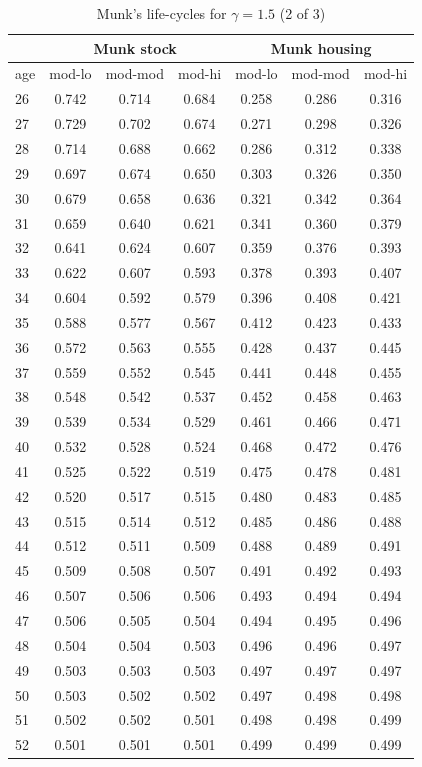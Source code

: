 \documentclass[]{elsarticle}
\begin{document}
\begin{appendix}
\begin{table}[H]
	\centering
	\caption[]{Munk's life-cycles for $\gamma = 1.5$ (2 of 3)}
	\begin{tabular}[c]{lcccccc}
&\multicolumn{3}{c}{Munk stock}&\multicolumn{3}{c}{Munk housing}\\
		\hline
age&mod-lo&mod-mod&mod-hi&mod-lo&mod-mod&mod-hi\\
		\hline
26&0.742&0.714&0.684&0.258&0.286&0.316\\
27&0.729&0.702&0.674&0.271&0.298&0.326\\
28&0.714&0.688&0.662&0.286&0.312&0.338\\
29&0.697&0.674&0.650&0.303&0.326&0.350\\
30&0.679&0.658&0.636&0.321&0.342&0.364\\
31&0.659&0.640&0.621&0.341&0.360&0.379\\
32&0.641&0.624&0.607&0.359&0.376&0.393\\
33&0.622&0.607&0.593&0.378&0.393&0.407\\
34&0.604&0.592&0.579&0.396&0.408&0.421\\
35&0.588&0.577&0.567&0.412&0.423&0.433\\
36&0.572&0.563&0.555&0.428&0.437&0.445\\
37&0.559&0.552&0.545&0.441&0.448&0.455\\
38&0.548&0.542&0.537&0.452&0.458&0.463\\
39&0.539&0.534&0.529&0.461&0.466&0.471\\
40&0.532&0.528&0.524&0.468&0.472&0.476\\
41&0.525&0.522&0.519&0.475&0.478&0.481\\
42&0.520&0.517&0.515&0.480&0.483&0.485\\
43&0.515&0.514&0.512&0.485&0.486&0.488\\
44&0.512&0.511&0.509&0.488&0.489&0.491\\
45&0.509&0.508&0.507&0.491&0.492&0.493\\
46&0.507&0.506&0.506&0.493&0.494&0.494\\
47&0.506&0.505&0.504&0.494&0.495&0.496\\
48&0.504&0.504&0.503&0.496&0.496&0.497\\
49&0.503&0.503&0.503&0.497&0.497&0.497\\
50&0.503&0.502&0.502&0.497&0.498&0.498\\
51&0.502&0.502&0.501&0.498&0.498&0.499\\
52&0.501&0.501&0.501&0.499&0.499&0.499\\

\end{tabular}
\end{table}
\end{appendix}
\end{document}
